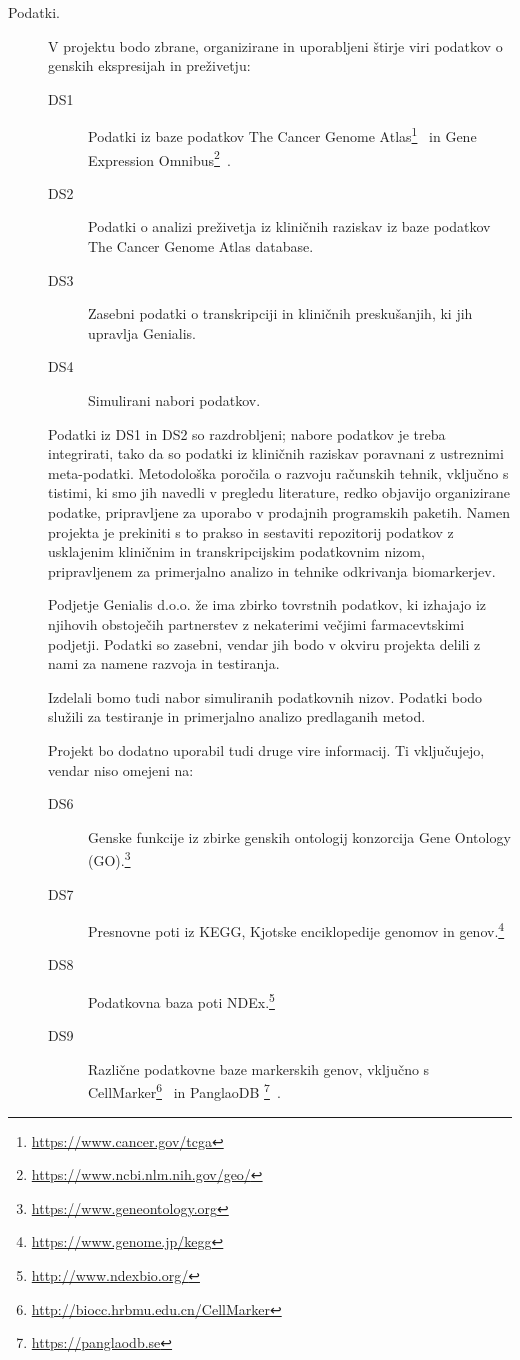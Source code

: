 \documentclass[11pt,a4paper]{article}
\newcommand{\myurl}[1]{\footnote{\url{#1}}}
\begin{document}
\begin{description}
	\item[Podatki.] V projektu bodo zbrane, organizirane in uporabljeni štirje viri podatkov o genskih ekspresijah in preživetju:
	\begin{description}
		\item[DS1] Podatki iz baze podatkov The Cancer Genome Atlas\myurl{https://www.cancer.gov/tcga}~\cite{24071849} in Gene Expression Omnibus\myurl{https://www.ncbi.nlm.nih.gov/geo/}~\cite{23193258}.
		\item[DS2] Podatki o analizi preživetja iz kliničnih raziskav iz baze podatkov The Cancer Genome Atlas database.
		\item[DS3] Zasebni podatki o transkripciji in kliničnih preskušanjih, ki jih upravlja Genialis.
		\item[DS4] Simulirani nabori podatkov.
	\end{description}
	Podatki iz DS1 in DS2 so razdrobljeni; nabore podatkov je treba integrirati, tako da so podatki iz kliničnih raziskav poravnani z ustreznimi meta-podatki. Metodološka poročila o razvoju računskih tehnik, vključno s tistimi, ki smo jih navedli v pregledu literature, redko objavijo organizirane podatke, pripravljene za uporabo v prodajnih programskih paketih. Namen projekta je prekiniti s to prakso in sestaviti repozitorij podatkov z usklajenim kliničnim in transkripcijskim podatkovnim nizom, pripravljenem za primerjalno analizo in tehnike odkrivanja biomarkerjev.

	Podjetje Genialis d.o.o. že ima zbirko tovrstnih podatkov, ki izhajajo iz njihovih obstoječih partnerstev z nekaterimi večjimi farmacevtskimi podjetji. Podatki so zasebni, vendar jih bodo v okviru projekta delili z nami za namene razvoja in testiranja.

	Izdelali bomo tudi nabor simuliranih podatkovnih nizov. Podatki bodo služili za testiranje in primerjalno analizo predlaganih metod.

	Projekt bo dodatno uporabil tudi druge vire informacij. Ti vključujejo, vendar niso omejeni na:

	\begin{description}
		\item[DS6] Genske funkcije iz zbirke genskih ontologij konzorcija Gene Ontology (GO).\myurl{https://www.geneontology.org}
		\item[DS7] Presnovne poti iz KEGG, Kjotske enciklopedije genomov in genov.\myurl{https://www.genome.jp/kegg}
		\item[DS8] Podatkovna baza poti NDEx.\myurl{http://www.ndexbio.org/}
		\item[DS9] Različne podatkovne baze markerskih genov, vključno s  CellMarker\myurl{http://biocc.hrbmu.edu.cn/CellMarker}~\cite{cellmarker} in PanglaoDB
		\myurl{https://panglaodb.se}~\cite{30951143}.
	\end{description}


\end{description}
\end{document}
